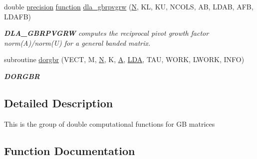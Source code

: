 \begin{DoxyCompactItemize}
double \hyperlink{numinquire_8h_a2c8e616467665d0b2814d4c1589ba74e}{precision} \hyperlink{afunc_8m_a7b5e596df91eadea6c537c0825e894a7}{function} \hyperlink{group__doubleGBcomputational_ga1770de12748787eb6d08a40771f502b5}{dla\+\_\+gbrpvgrw} (\hyperlink{polmisc_8c_a0240ac851181b84ac374872dc5434ee4}{N}, K\+L, K\+U, N\+C\+O\+L\+S, A\+B, L\+D\+A\+B, A\+F\+B, L\+D\+A\+F\+B)
\begin{DoxyCompactList}\small\item\em {\bfseries D\+L\+A\+\_\+\+G\+B\+R\+P\+V\+G\+R\+W} computes the reciprocal pivot growth factor norm(\+A)/norm(U) for a general banded matrix. \end{DoxyCompactList}\item 
subroutine \hyperlink{group__doubleGBcomputational_ga3cef6a16beac76badd73886c843d2c31}{dorgbr} (V\+E\+C\+T, M, \hyperlink{polmisc_8c_a0240ac851181b84ac374872dc5434ee4}{N}, K, \hyperlink{classA}{A}, \hyperlink{example__user_8c_ae946da542ce0db94dced19b2ecefd1aa}{L\+D\+A}, T\+A\+U, W\+O\+R\+K, L\+W\+O\+R\+K, I\+N\+F\+O)
\begin{DoxyCompactList}\small\item\em {\bfseries D\+O\+R\+G\+B\+R} \end{DoxyCompactList}\end{DoxyCompactItemize}


\subsection{Detailed Description}
This is the group of double computational functions for G\+B matrices 

\subsection{Function Documentation}
\hypertarget{group__doubleGBcomputational_gadcc28a5e7f0df2097dc2bfbe2d287621}{}
